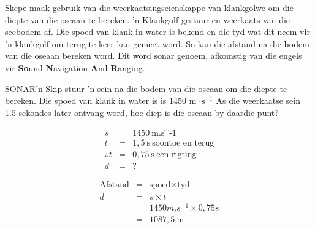 \begin{minipage}{.5\textwidth}
\begin{figure}[H]
\begin{center}
\end{center}
\end{figure}       
\end{minipage}
\begin{minipage}{.5\textwidth}
Skepe maak gebruik van die weerkaatsingseienskappe van klankgolwe om die diepte van die oseaan te bereken. 'n Klankgolf gestuur en weerkaats van die seebodem af. Die spoed van klank in water is bekend en die tyd wat dit neem vir 'n klankgolf om terug te keer kan gemeet word. So kan die afstand na die bodem van die oseaan bereken word. Dit word sonar genoem, afkomstig van die engels vir \textbf{So}und \textbf{N}avigation \textbf{A}nd \textbf{R}anging.\par    
 \end{minipage}
            

\begin{wex}{SONAR}{'n Skip stuur 'n sein na die bodem van die oseaan om die diepte te bereken. Die spoed van klank in water is is 1450 $\text{m}\cdot\text{s}^{-1}$ As die weerkaatse sein 1.5 sekondes later ontvang word, hoe diep is die oseaan by daardie punt?}{
\begin{eqnarray*}
s &=& 1450 \ \text{m.s^{-1}}\\
t &=& 1,5 \ \text{s} \ \text{soontoe \ en \ terug}\\
\therefore t &= & 0,75 \ \text{s} \ \text{een \ rigting}\\
d &=& ?
\end{eqnarray*}

\begin{eqnarray*}
\text{Afstand} &=& \text{spoed} \times \text{tyd} \\
d &=& s \times t \\
&=& 1450 m.s^{-1} \times 0,75 s \\
&=& 1087,5 \ \text{m}
\end{eqnarray*}
}\end{wex}
          
